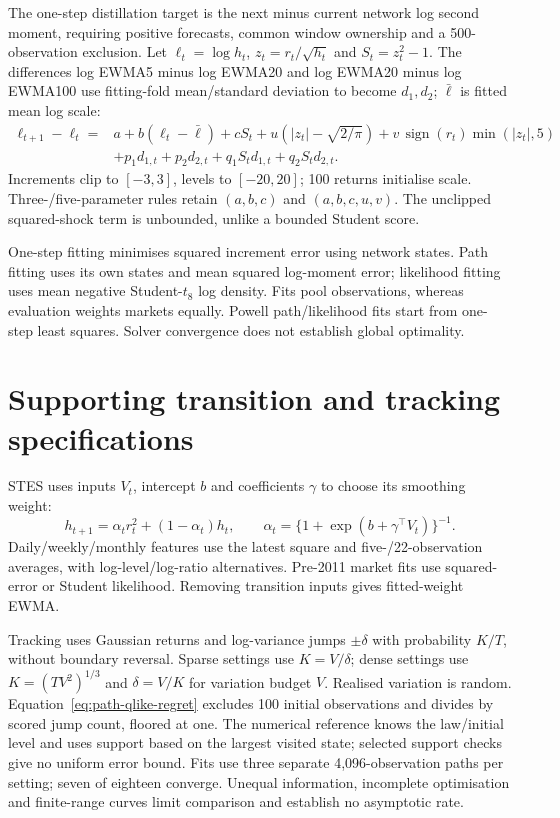 The one-step distillation target is the next minus current network log second moment, requiring positive forecasts, common window ownership and a 500-observation exclusion. Let $\ell_t=\log h_t$, $z_t=r_t/\sqrt{h_t}$ and $S_t=z_t^2-1$. The differences log EWMA5 minus log EWMA20 and log EWMA20 minus log EWMA100 use fitting-fold mean/standard deviation to become $d_1,d_2$; $\bar\ell$ is fitted mean log scale:
\begin{align}
 \ell_{t+1}-\ell_t={}&a+b(\ell_t-\bar\ell)+cS_t
 +u\left(|z_t|-\sqrt{2/\pi}\right)
 +v\,\operatorname{sign}(r_t)\min(|z_t|,5) \nonumber\\
 &+p_1d_{1,t}+p_2d_{2,t}
 +q_1S_td_{1,t}+q_2S_td_{2,t}.
 \label{eq:explicit-recursion}
\end{align}
Increments clip to $[-3,3]$, levels to $[-20,20]$; 100 returns initialise scale. Three-/five-parameter rules retain $(a,b,c)$ and $(a,b,c,u,v)$. The unclipped squared-shock term is unbounded, unlike a bounded Student score.

One-step fitting minimises squared increment error using network states. Path fitting uses its own states and mean squared log-moment error; likelihood fitting uses mean negative Student-$t_8$ log density. Fits pool observations, whereas evaluation weights markets equally. Powell path/likelihood fits start from one-step least squares. Solver convergence does not establish global optimality.

\section{Supporting transition and tracking specifications}

STES uses inputs $V_t$, intercept $b$ and coefficients $\gamma$ to choose its smoothing weight:
\begin{equation}
 h_{t+1}=\alpha_t r_t^2+(1-\alpha_t)h_t,\qquad
 \alpha_t=\{1+\exp(b+\gamma^\top V_t)\}^{-1}.
 \label{eq:stes-recursion}
\end{equation}
Daily/weekly/monthly features use the latest square and five-/22-observation averages, with log-level/log-ratio alternatives. Pre-2011 market fits use squared-error or Student likelihood. Removing transition inputs gives fitted-weight EWMA.

Tracking uses Gaussian returns and log-variance jumps $\pm\delta$ with probability $K/T$, without boundary reversal. Sparse settings use $K=V/\delta$; dense settings use $K=(TV^2)^{1/3}$ and $\delta=V/K$ for variation budget $V$. Realised variation is random. Equation~\eqref{eq:path-qlike-regret} excludes 100 initial observations and divides by scored jump count, floored at one. The numerical reference knows the law/initial level and uses support based on the largest visited state; selected support checks give no uniform error bound. Fits use three separate 4,096-observation paths per setting; seven of eighteen converge. Unequal information, incomplete optimisation and finite-range curves limit comparison and establish no asymptotic rate.


